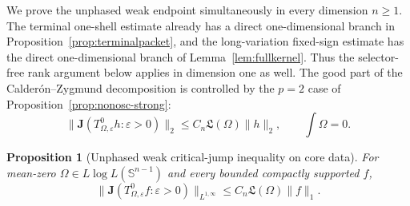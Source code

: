 \documentclass[11pt]{article}
\numberwithin{equation}{section}
\newtheorem{proposition}[theorem]{Proposition}
\theoremstyle{remark}
\theoremstyle{definition}
\newcommand{\Sph}{\mathbb S}
\newcommand{\norm}[1]{\lVert #1\rVert}
\begin{document}
We prove the unphased weak endpoint simultaneously in every dimension
$n\ge1$.  The terminal one-shell estimate already has a direct
one-dimensional branch in Proposition~\ref{prop:terminalpacket}, and the
long-variation fixed-sign estimate has the direct one-dimensional branch
of Lemma~\ref{lem:fullkernel}.  Thus the selector-free rank argument below
applies in dimension one as well.  The good part
of the Calder\'on--Zygmund decomposition is controlled by the $p=2$ case
of Proposition~\ref{prop:nonosc-strong}:
\begin{equation}\label{eq:nonosc-L2}
 \norm{\mathbf J(T^0_{\Omega,\varepsilon}h:\varepsilon>0)}_2
 \le C_n\mathfrak L(\Omega)\norm h_2,
 \qquad \int\Omega=0.
\end{equation}

\begin{proposition}[Unphased weak critical-jump inequality on core data]
\label{prop:nonoscweak}
For mean-zero $\Omega\in L\log L(\Sph^{n-1})$ and every
bounded compactly supported $f$,
\begin{equation}\label{eq:nonoscweak}
 \norm{\mathbf J(T^0_{\Omega,\varepsilon}f:\varepsilon>0)}_{L^{1,\infty}}
 \le C_n\mathfrak L(\Omega)\norm f_1.
\end{equation}
\end{proposition}
\end{document}
